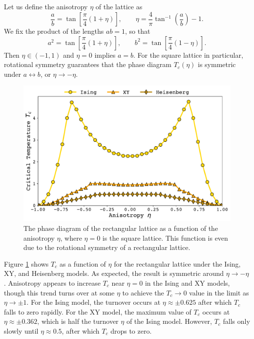 \documentclass[
  amsmath,
  amssymb,
  aps,
  twocolumn,
  nofootinbib,
  nolongbibliography,
  floatfix,
]{revtex4-2}
\newcommand{\parens}[1]{\left ( #1 \right )}
\newcommand{\brackets}[1]{\left [ #1 \right ]}
\begin{document}
Let us define the anisotropy $\eta$ of the lattice as 
\begin{equation}
  \frac{a}{b} = \tan\brackets{\frac{\pi}{4}\parens{1+\eta}},\qquad \eta = \frac{4}{\pi}\tan^{-1}\parens{\frac{a}{b}}-1.
  \label{eqn:anisotropy}
\end{equation}
We fix the product of the lengths $ab=1$, so that 
\begin{equation}
  a^2 = \tan\brackets{\frac{\pi}{4}\parens{1+\eta}},\qquad b^2 = \tan\brackets{\frac{\pi}{4}\parens{1-\eta}}.
\end{equation}
Then $\eta \in (-1,1)$ and $\eta=0$ implies $a=b$. For the square lattice in particular, rotational symmetry guarantees that the phase diagram $T_c(\eta)$ is symmetric under $a\leftrightarrow b$, or $\eta \rightarrow -\eta$.

\begin{figure}
  \centering
  \includegraphics[width=\linewidth]{../figs/rect-phase.pdf}
  \caption{The phase diagram of the rectangular lattice as a function of the anisotropy $\eta$, where $\eta = 0$ is the square lattice. This function is even due to the rotational symmetry of a rectangular lattice.}
  \label{fig:rect-phase}
\end{figure}

Figure \ref{fig:rect-phase} shows $T_c$ as a function of $\eta$ for the rectangular lattice under the Ising, XY, and Heisenberg models. As expected, the result is symmetric around $\eta \rightarrow -\eta$. Anisotropy appears to increase $T_c$ near $\eta = 0$ in the Ising and XY models, though this trend turns over at some $\eta$ to achieve the $T_c\rightarrow 0$ value in the limit as $\eta \rightarrow \pm 1$. For the Ising model, the turnover occurs at $\eta\approx \pm 0.625$ after which $T_c$ falls to zero rapidly. For the XY model, the maximum value of $T_c$ occurs at $\eta \approx \pm 0.362$, which is half the turnover $\eta$ of the Ising model. However, $T_c$ falls only slowly until $\eta \approx 0.5$, after which $T_c$ drops to zero.
\end{document}
